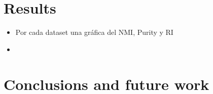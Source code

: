 \documentclass[runningheads]{llncs}
\begin{document}
\section{Results}

\begin{itemize}
\item Por cada dataset una gráfica del NMI, Purity y RI
\item 
\end{itemize}
\section{Conclusions and future work}

%
%
%


%
\end{document}
